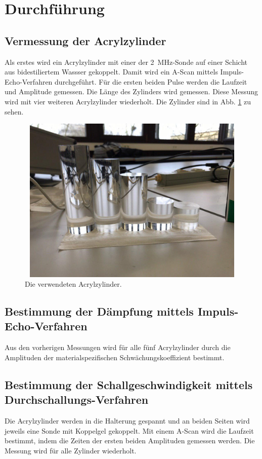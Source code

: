\section{Durchführung}
\label{sec:Durchführung}

\subsection{Vermessung der Acrylzylinder}
Als erstes wird ein Acrylzylinder mit 
einer der \SI{2}{\mega\hertz}-Sonde auf einer Schicht aus bidestiliertem 
Wassser gekoppelt. Damit wird ein A-Scan mittels 
Impuls-Echo-Verfahren durchgeführt. Für die ersten beiden 
Pulse werden die Laufzeit und Amplitude 
gemessen. 
Die Länge des Zylinders wird gemessen.
Diese Messung wird mit vier weiteren Acrylzylinder wiederholt.
Die Zylinder sind in Abb. \ref{fig:zylinder} zu sehen.
\begin{figure}
    \centering
    \includegraphics[width=12cm, height=8cm]{build/BildZylinder.jpg}
    \caption{Die verwendeten Acrylzylinder.}
    \label{fig:zylinder}
\end{figure}

\subsection{Bestimmung der Dämpfung mittels Impuls-Echo-Verfahren}
Aus den vorherigen Messungen wird für alle fünf Acrylzylinder
durch die Amplituden der materialspezifischen Schwächungskoeffizient bestimmt.

\subsection{Bestimmung der Schallgeschwindigkeit mittels Durchschallungs-Verfahren}
Die Acrylzylinder werden in die Halterung gespannt und an 
beiden Seiten wird jeweils eine Sonde mit Koppelgel gekoppelt. 
Mit einem A-Scan wird die Laufzeit bestimmt, indem die Zeiten
der ersten beiden Amplituden gemessen werden. Die Messung wird für alle 
Zylinder wiederholt.


